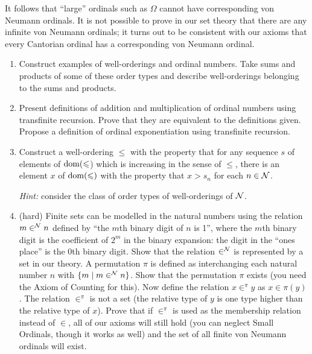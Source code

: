 It follows that ``large'' ordinals such as $\Omega$
cannot have corresponding von Neumann ordinals.  It
is not possible to prove in our set theory that there are any
infinite von Neumann ordinals; it
turns out to be consistent with our axioms that every Cantorian
ordinal has a corresponding von Neumann ordinal. 

\Exercises

\begin{enumerate}
\item Construct examples of well-orderings and ordinal
  numbers.  Take sums and products of some of these order types and describe well-orderings belonging to the sums and products.

\item  Present definitions of addition and
  multiplication of ordinal numbers using
  transfinite recursion.  Prove that they are
  equivalent to the definitions given.  Propose a definition of ordinal
  exponentiation using transfinite recursion.

\item  Construct a well-ordering $\leq$ with the property
  that for any sequence $s$ of elements of $\mathop{\mathrm{dom}}(\leqslant$) which
  is   increasing in the sense of $\leq$, there is an element $x$ of
  $\mathop{\mathrm{dom}}(\leqslant)$
  with the property that $x > s_n$ for each $n \in {\cal N}$.

  {\itshape Hint:}  consider
  the class of order types of well-orderings of $\cal N$.

\item  (hard) Finite sets can be modelled in the
  natural numbers using the relation $m \in^{{\cal N}} n$
  defined by ``the $m$th binary digit of $n$ is 1'', where the $m$th binary
  digit is the coefficient of $2^m$ in the binary expansion: the digit in the
  ``ones place'' is the 0th binary digit.  Show that the
  relation $\in^{{\cal N}}$ is represented by a set in our
  theory.   A permutation $\pi$ is defined as interchanging each natural number
  $n$ with $\{m \mid m \in^{{\cal N}} n\}$.  Show that the permutation $\pi$
  exists (you need the Axiom of Counting for this).
  Now define the relation $x \in^{\pi} y$ as $x \in \pi(y)$.  The relation
  $\in^{\pi}$ is not a set (the relative type of $y$ is
  one type higher than the relative type of $x$).  Prove that if $\in^{\pi}$ is
  used as the membership relation instead of $\in$, all of
  our axioms  will still hold (you can neglect Small Ordinals, though it works as well) and the set of all
  finite von Neumann ordinals will exist.
\end{enumerate}
